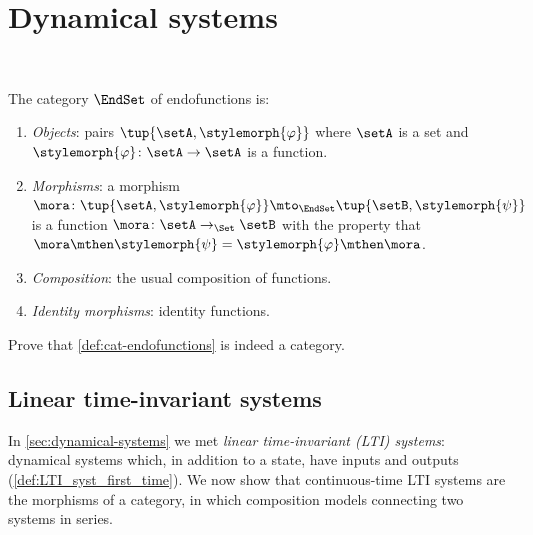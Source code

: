 
\section[Dynamical systems]{Dynamical systems}
\label{sec:cat-dyn}


\

\begin{ctdefinition}[Endofunctions]
    \label{def:cat-endofunctions}
    The category $\EndSet$ of endofunctions is:
    \begin{enumerate}
        \item \emph{Objects}: pairs $\tup{\setA, \stylemorph{\varphi}}$ where $\setA$ is a set and $\stylemorph{\varphi} \colon \setA \to \setA$ is a function.
        \item \emph{Morphisms}: a morphism $\mora \colon \tup{\setA, \stylemorph{\varphi}} \mto_\EndSet \tup{\setB, \stylemorph{\psi}}$ is a function $\mora \colon \setA \to_\Set \setB$ with the property that $\mora \mthen \stylemorph{\psi}= \stylemorph{\varphi} \mthen \mora$.
        \item \emph{Composition}: the usual composition of functions.
        \item \emph{Identity morphisms}: identity functions.
    \end{enumerate}
\end{ctdefinition}


\begin{gradedexercise}
    \label{ex:endofunctions}

Prove that \cref{def:cat-endofunctions} is indeed a category.

\end{gradedexercise}




\subsection{Linear time-invariant systems}
\label{sec:cat-dyn-lti}

In \cref{sec:dynamical-systems} we met \emph{linear time-invariant (LTI) systems}: dynamical systems which, in addition to a state, have inputs and outputs (\cref{def:LTI_syst_first_time}).
We now show that continuous-time LTI systems are the morphisms of a category, in which composition models connecting two systems in series.

